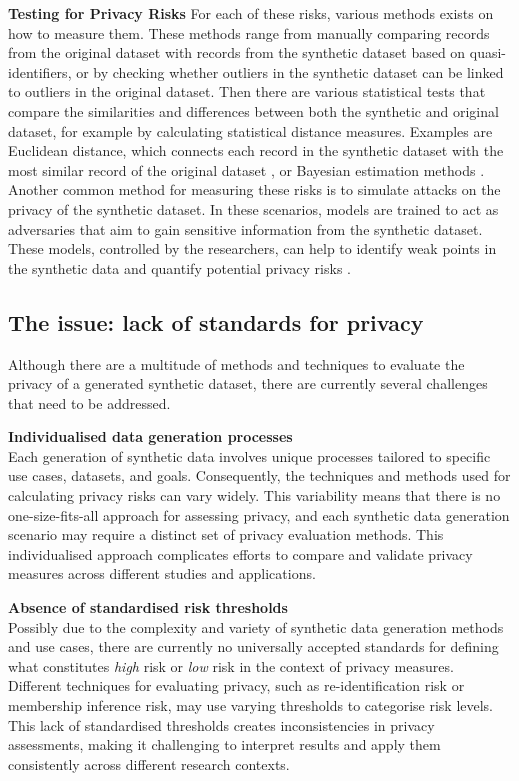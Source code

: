 \textbf{Testing for Privacy Risks}
For each of these risks, various methods exists on how to measure them. These methods range from manually comparing records from the original dataset with records from the synthetic dataset based on quasi-identifiers, or by checking whether outliers in the synthetic dataset can be linked to outliers in the original dataset. Then there are various statistical tests that compare the similarities and differences between both the synthetic and original dataset, for example by calculating statistical distance measures. Examples are Euclidean distance, which connects each record in the synthetic dataset with the most similar record of the original dataset \cite{hittmeir2019utility}, or Bayesian estimation methods \cite{hu2018bayesian}. Another common method for measuring these risks is to simulate attacks on the privacy of the synthetic dataset. In these scenarios, models are trained to act as adversaries that aim to gain sensitive information from the synthetic dataset. These models, controlled by the researchers, can help to identify weak points in the synthetic data and quantify potential privacy risks \cite{boudewijn2023privacy,van2023membership,hittmeir2020baseline}.

 \subsection{The issue: lack of standards for privacy}
 Although there are a multitude of methods and techniques to evaluate the privacy of a generated synthetic dataset, there are currently several challenges that need to be addressed. 
 
 \textbf{Individualised data generation processes} \\
 Each generation of synthetic data involves unique processes tailored to specific use cases, datasets, and goals. Consequently, the techniques and methods used for calculating privacy risks can vary widely. This variability means that there is no one-size-fits-all approach for assessing privacy, and each synthetic data generation scenario may require a distinct set of privacy evaluation methods. This individualised approach complicates efforts to compare and validate privacy measures across different studies and applications.
 
 \textbf{Absence of standardised risk thresholds} \\
Possibly due to the complexity and variety of synthetic data generation methods and use cases, there are currently no universally accepted standards for defining what constitutes \textit{high} risk or \textit{low} risk in the context of privacy measures. Different techniques for evaluating privacy, such as re-identification risk or membership inference risk, may use varying thresholds to categorise risk levels. This lack of standardised thresholds creates inconsistencies in privacy assessments, making it challenging to interpret results and apply them consistently across different research contexts. 
 
